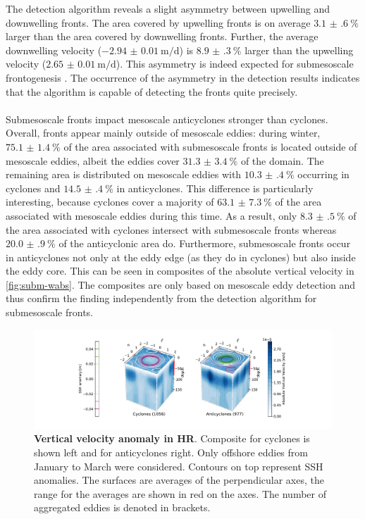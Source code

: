 The detection algorithm reveals a slight asymmetry between upwelling and downwelling fronts. The area covered by upwelling fronts is on average $\SI[separate-uncertainty]{3.1(6)}{\percent}$ larger than the area covered by downwelling fronts. Further, the average downwelling velocity ($\SI[separate-uncertainty]{-2.94(1)}{\metre\per\day}$) is $\SI{8.9(3)}{\percent}$ larger than the upwelling velocity ($\SI[separate-uncertainty]{2.65(1)}{\metre\per\day}$). This asymmetry is indeed expected for submesoscale frontogenesis \autocite{mahadevan-2006-subm-fronts-asym}. The occurrence of the asymmetry in the detection results indicates that the algorithm is capable of detecting the fronts quite precisely.\\
\\
Submesoscale fronts impact mesoscale anticyclones stronger than cyclones. Overall, fronts appear mainly outside of mesoscale eddies: during winter, $\SI[separate-uncertainty]{75.1(14)}{\percent}$ of the area associated with submesoscale fronts is located outside of mesoscale eddies, albeit the eddies cover $\SI[separate-uncertainty]{31.3(34)}{\percent}$ of the domain. The remaining area is distributed on mesoscale eddies with $\SI[separate-uncertainty]{10.3(4)}{\percent}$ occurring in cyclones and $\SI[separate-uncertainty]{14.5(4)}{\percent}$ in anticyclones. This difference is particularly interesting, because cyclones cover a majority of $\SI[separate-uncertainty]{63.1(73)}{\percent}$ of the area associated with mesoscale eddies during this time. As a result, only $\SI[separate-uncertainty]{8.3(5)}{\percent}$ of the area associated with cyclones intersect with submesoscale fronts whereas $\SI[separate-uncertainty]{20.0(9)}{\percent}$ of the anticyclonic area do. Furthermore, submesoscale fronts occur in anticyclones not only at the eddy edge (as they do in cyclones) but also inside the eddy core. This can be seen in composites of the absolute vertical velocity in \autoref{fig:subm-wabs}. The composites are only based on mesoscale eddy detection and thus confirm the finding independently from the detection algorithm for submesoscale fronts.\\
\begin{figure}[h]
    \centering
    \hspace*{0.3cm}\includegraphics[width=17cm, trim=5cm 0 0 0]{../figures/result_composites_w-abs-p15}
    \caption[Vertical velocity anomaly in HR]{\textbf{Vertical velocity anomaly in HR}. Composite for cyclones is shown left and for anticyclones right. Only offshore eddies from January to March were considered. Contours on top represent SSH anomalies. The surfaces are averages of the perpendicular axes, the range for the averages are shown in red on the axes. The number of aggregated eddies is denoted in brackets.}\label{fig:subm-wabs}
\end{figure}
